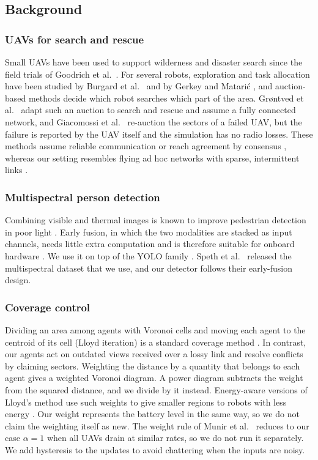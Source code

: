 \documentclass[10pt,a4paper,twocolumn]{article}
\begin{document}
\subsection{Background}\label{sec:related}
\subsubsection{UAVs for search and rescue}
Small UAVs have been used to support wilderness and disaster search since the field trials of Goodrich et al.\ \cite{goodrich2008}. For several robots, exploration and task allocation have been studied by Burgard et al.\ \cite{burgard2005} and by Gerkey and Matari\'c \cite{gerkey2004}, and auction-based methods decide which robot searches which part of the area. Grøntved et al.\ \cite{grontved2023} adapt such an auction to search and rescue and assume a fully connected network, and Giacomossi et al.\ \cite{giacomossi2026} re-auction the sectors of a failed UAV, but the failure is reported by the UAV itself and the simulation has no radio losses. These methods assume reliable communication or reach agreement by consensus \cite{olfatisaber2007}, whereas our setting resembles flying ad hoc networks with sparse, intermittent links \cite{bekmezci2013}.

\subsubsection{Multispectral person detection}
Combining visible and thermal images is known to improve pedestrian detection in poor light \cite{hwang2015kaist,jia2021llvip}. Early fusion, in which the two modalities are stacked as input channels, needs little extra computation and is therefore suitable for onboard hardware \cite{speth2022}. We use it on top of the YOLO family \cite{redmon2016yolo,jocher2024yolo11}. Speth et al.\ \cite{speth2022} released the multispectral dataset that we use, and our detector follows their early-fusion design.

\subsubsection{Coverage control}
Dividing an area among agents with Voronoi cells and moving each agent to the centroid of its cell (Lloyd iteration) is a standard coverage method \cite{lloyd1982,du1999cvt,cortes2004coverage}. In contrast, our agents act on outdated views received over a lossy link and resolve conflicts by claiming sectors. Weighting the distance by a quantity that belongs to each agent gives a weighted Voronoi diagram. A power diagram \cite{aurenhammer1987power} subtracts the weight from the squared distance, and we divide by it instead. Energy-aware versions of Lloyd's method use such weights to give smaller regions to robots with less energy \cite{kwok2007,munir2024}. Our weight represents the battery level in the same way, so we do not claim the weighting itself as new. The weight rule of Munir et al.\ \cite{munir2024} reduces to our case $\alpha=1$ when all UAVs drain at similar rates, so we do not run it separately. We add hysteresis to the updates to avoid chattering when the inputs are noisy.
\end{document}
